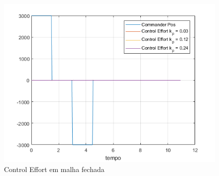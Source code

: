 \documentclass[a4paper,11pt]{article}
\begin{document}
\begin{figure}[H]
\centering
\includegraphics{exp02e06-control-effort}
\caption{Control Effort em malha fechada}
\end{figure}
\end{document}
